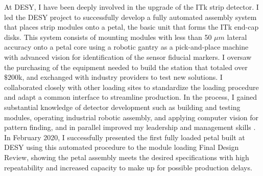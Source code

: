 \documentclass[a4paper]{article}
\begin{document}
At DESY, I have been deeply involved in the upgrade of the ITk strip detector\cite{ITKstrips}.
I led the DESY project to successfully develop a fully automated assembly system that places strip modules onto a petal, the basic unit that forms the ITk end-cap disks.
This system consists of mounting modules with less than 50 $\mu m$ lateral accuracy onto a petal core using a robotic gantry as a pick-and-place machine with advanced vision for identification of the sensor fiducial markers. I oversaw the purchasing of the equipment needed to build the station that totaled over $\$200$k, and exchanged with industry providers to test new solutions. I collaborated closely with other loading sites to standardize the loading procedure and adapt a common interface to streamline production.
In the process, I gained substantial knowledge of detector development such as building and testing modules, operating industrial robotic assembly, and applying computer vision for pattern finding, and in parallel improved my leadership and management skills
. In February 2020, I successfully presented the first fully loaded petal built at DESY using this automated procedure to the module loading Final Design Review, showing the petal assembly meets the desired specifications with high repeatability and increased capacity to make up for possible production delays.


\end{document}
